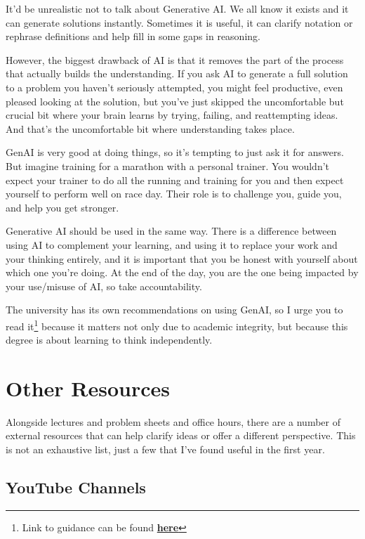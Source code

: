 It'd be unrealistic not to talk about Generative AI. We all know it exists and it can generate solutions instantly. Sometimes it is useful, it can clarify notation or rephrase definitions and help fill in some gaps in reasoning.

However, the biggest drawback of AI is that it removes the part of the process that actually builds the understanding. If you ask AI to generate a full solution to a problem you haven't seriously attempted, you might feel productive, even pleased looking at the solution, but you've just skipped the uncomfortable but crucial bit where your brain learns by trying, failing, and reattempting ideas. And that's the uncomfortable bit where understanding takes place. 

GenAI is very good at doing things, so it’s tempting to just ask it for answers. But imagine training for a marathon with a personal trainer. You wouldn’t expect your trainer to do all the running and training for you and then expect yourself to perform well on race day. Their role is to challenge you, guide you, and help you get stronger.

Generative AI should be used in the same way. There is a difference between using AI to complement your learning, and using it to replace your work and your thinking entirely, and it is important that you be honest with yourself about which one you're doing. At the end of the day, you are the one being impacted by your use/misuse of AI, so take accountability. 

The university has its own recommendations on using GenAI, so I urge you to read it\footnote{Link to guidance can be found \textbf{\href{https://www.southampton.ac.uk/about/governance/regulations-policies/policies/using-gen-ai-during-your-studies}{here}}} because it matters not only due to academic integrity, but because this degree is about learning to think independently. 

\section{Other Resources}

Alongside lectures and problem sheets and office hours, there are a number of external resources that can help clarify ideas or offer a different perspective. This is not an exhaustive list, just a few that I’ve found useful in the first year. 

\subsection{YouTube Channels}

